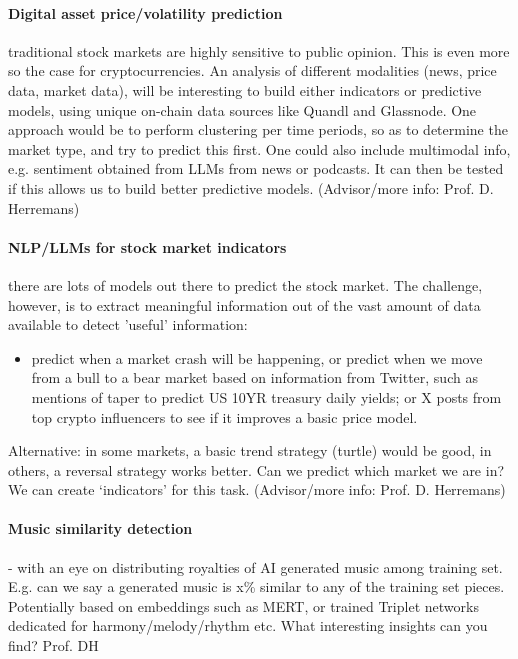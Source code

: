 \documentclass[DIV12, oneside]{scrartcl}
\begin{document}
\paragraph{Digital asset price/volatility prediction} traditional stock markets are highly sensitive to public opinion. This is even more so the case for cryptocurrencies. An analysis of different modalities (news, price data, market data), will be interesting to build either indicators or predictive models, using unique on-chain data sources like Quandl and Glassnode. One approach would be to perform clustering per time periods, so as to determine the market type, and try to predict this first. One could also include multimodal info, e.g. sentiment obtained from LLMs from news or podcasts. It can then be tested if this allows us to build better predictive models. (Advisor/more info: Prof. D. Herremans)


\paragraph{NLP/LLMs for stock market indicators} there are lots of models out there to predict the stock market. The challenge, however, is to extract meaningful information out of the vast amount of data available to detect 'useful' information:
\begin{itemize}
    \item predict when a market crash will be happening, or predict when we move from a bull to a bear market based on information from Twitter, such as mentions of taper to predict US 10YR treasury daily yields; or X posts from top crypto influencers to see if it improves a basic price model. 
\end{itemize} Alternative: in some markets, a basic trend strategy (turtle) would be good, in others, a reversal strategy works better. Can we predict which market we are in? We can create `indicators' for this task. 
(Advisor/more info: Prof. D. Herremans)




\paragraph{Music similarity detection } - with an eye on distributing royalties of AI generated music among training set. E.g. can we say a generated music is x\% similar to any of the training set pieces. Potentially based on embeddings such as MERT, or trained Triplet networks dedicated for harmony/melody/rhythm etc. What interesting insights can you find? Prof. DH
\end{document}
